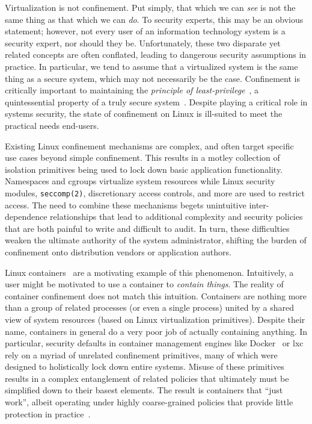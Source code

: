 Virtualization is not confinement. Put simply, that which we can \textit{see} is not the
same thing as that which we can \textit{do}. To security experts, this may be an obvious
statement; however, not every user of an information technology system is a security
expert, nor should they be. Unfortunately, these two disparate yet related concepts are
often conflated, leading to dangerous security assumptions in practice. In particular, we
tend to assume that a virtualized system is the same thing as a secure system, which may
not necessarily be the case. Confinement is critically important to maintaining the
\textit{principle of least-privilege}~\cite{schneider03_least_privilege}, a quintessential
property of a truly secure system~\cite{van_oorschot2020_tools_jewels}. Despite playing
a critical role in systems security, the state of confinement on Linux is ill-suited to
meet the practical needs end-users.

Existing Linux confinement mechanisms are complex, and often target specific use cases
beyond simple confinement. This results in a motley collection of isolation primitives
being used to lock down basic application functionality. Namespaces and cgroups virtualize
system resources while Linux security modules, \texttt{seccomp(2)}, discretionary access
controls, and more are used to restrict access. The need to combine these mechanisms
begets unintuitive inter-dependence relationships that lead to additional complexity and
security policies that are both painful to write and difficult to audit. In turn, these
difficulties weaken the ultimate authority of the system administrator, shifting the
burden of confinement onto distribution vendors or application authors.

Linux containers~\cite{docker_security, lxc_security, lin2018_container_security,
sultan2019_container_security} are a motivating example of this phenomenon. Intuitively,
a user might be motivated to use a container to \textit{contain things}. The reality of
container confinement does not match this intuition. Containers are nothing more than
a group of related processes (or even a single process) united by a shared view of system
resources (based on Linux virtualization primitives). Despite their name, containers in
general do a very poor job of actually containing anything. In particular, security
defaults in container management engines like Docker~\cite{docker_security} or
\gls{lxc}~\cite{lxc_security} rely on a myriad of unrelated confinement primitives, many
of which were designed to holistically lock down entire systems. Misuse of these
primitives results in a complex entanglement of related policies that ultimately must be
simplified down to their basest elements. The result is containers that \enquote{just
work}, albeit operating under highly coarse-grained policies that provide little
protection in practice~\cite{sultan2019_container_security, lin2018_container_security}.


